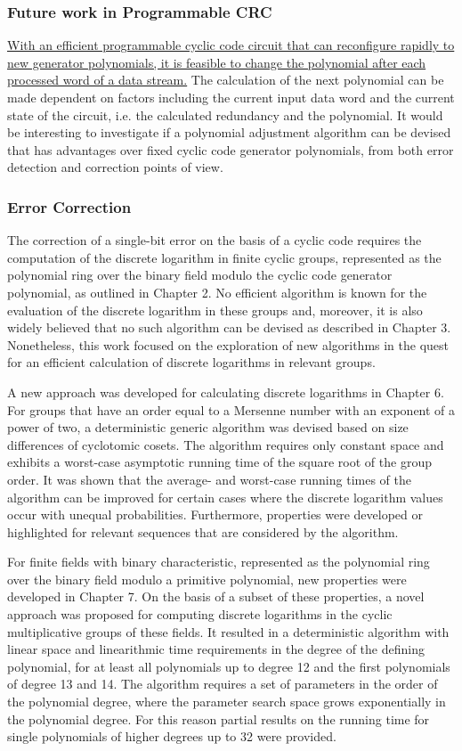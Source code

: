 \documentclass[a4paper, 11pt]{article}
\begin{document}
\subsubsection{Future work in Programmable CRC}
\ul{With an efficient programmable cyclic code circuit that can reconfigure rapidly to new generator polynomials, it is feasible to change the polynomial after each processed word of a data stream.} The calculation of the next polynomial can be made dependent on factors including the current input data word and the current state of the circuit, i.e. the calculated redundancy and the polynomial. It would be interesting to investigate if a polynomial adjustment algorithm can be devised that has advantages over fixed cyclic code generator polynomials, from both error detection and correction points of view.

\subsubsection{Error Correction}
The correction of a single-bit error on the basis of a cyclic code requires the computation of the discrete logarithm in finite cyclic groups, represented as the polynomial ring over the binary field modulo the cyclic code generator polynomial, as outlined in Chapter 2. No efficient algorithm is known for the evaluation of the discrete logarithm in these groups and, moreover, it is also widely believed that no such algorithm can be devised as described in Chapter 3. Nonetheless, this work focused on the exploration of new algorithms in the quest for an efficient calculation of discrete logarithms in relevant groups.

A new approach was developed for calculating discrete logarithms in Chapter 6. For groups that have an order equal to a Mersenne number with an exponent of a power of two, a deterministic generic algorithm was devised based on size differences of cyclotomic cosets. The algorithm requires only constant space and exhibits a worst-case asymptotic running time of the square root of the group order. It was shown that the average- and worst-case running times of the algorithm can be improved for certain cases where the discrete logarithm values occur with unequal probabilities. Furthermore, properties were developed or highlighted for relevant sequences that are considered by the algorithm.

For finite fields with binary characteristic, represented as the polynomial ring over the binary field modulo a primitive polynomial, new properties were developed in Chapter 7. On the basis of a subset of these properties, a novel approach was proposed for computing discrete logarithms in the cyclic multiplicative groups of these fields. It resulted in a deterministic algorithm with linear space and linearithmic time requirements in the degree of the defining polynomial, for at least all polynomials up to degree 12 and the first polynomials of degree 13 and 14. The algorithm requires a set of parameters in the order of the polynomial degree, where the parameter search space grows exponentially in the polynomial degree. For this reason partial results on the running time for single polynomials of higher degrees up to 32 were provided.
\end{document}

